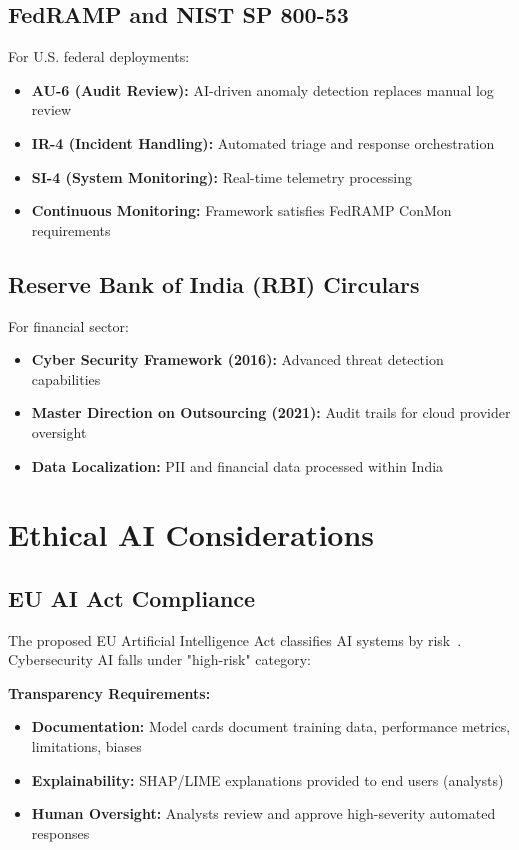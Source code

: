 \subsection{FedRAMP and NIST SP 800-53}
For U.S. federal deployments:
\begin{itemize}
    \item \textbf{AU-6 (Audit Review):} AI-driven anomaly detection replaces manual log review
    \item \textbf{IR-4 (Incident Handling):} Automated triage and response orchestration
    \item \textbf{SI-4 (System Monitoring):} Real-time telemetry processing
    \item \textbf{Continuous Monitoring:} Framework satisfies FedRAMP ConMon requirements
\end{itemize}

\subsection{Reserve Bank of India (RBI) Circulars}
For financial sector:
\begin{itemize}
    \item \textbf{Cyber Security Framework (2016):} Advanced threat detection capabilities
    \item \textbf{Master Direction on Outsourcing (2021):} Audit trails for cloud provider oversight
    \item \textbf{Data Localization:} PII and financial data processed within India
\end{itemize}

\section{Ethical AI Considerations}\label{sec:policy-ethicalai}
\subsection{EU AI Act Compliance}
The proposed EU Artificial Intelligence Act classifies AI systems by risk~\cite{euaiact2023}. Cybersecurity AI falls under "high-risk" category:

\textbf{Transparency Requirements:}
\begin{itemize}
    \item \textbf{Documentation:} Model cards document training data, performance metrics, limitations, biases
    \item \textbf{Explainability:} SHAP/LIME explanations provided to end users (analysts)
    \item \textbf{Human Oversight:} Analysts review and approve high-severity automated responses
\end{itemize}

